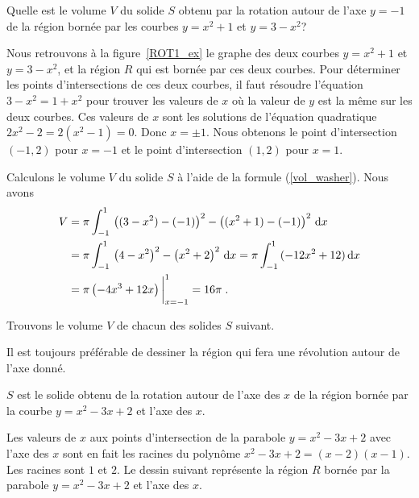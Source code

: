 {\begin{egg}
Quelle est le volume $V$ du solide $S$ obtenu par la rotation autour de l'axe
$y=-1$ de la région bornée par les courbes $y=x^2+1$ et $y=3-x^2$?

Nous retrouvons à la figure~\ref{ROT1_ex} le graphe des deux courbes
$y=x^2+1$ et $y=3-x^2$, et la région $R$ qui est bornée par ces deux
courbes.  Pour
déterminer les points d'intersections de ces deux courbes, il faut résoudre
l'équation $3-x^2 = 1+x^2$ pour trouver les valeurs de $x$ où la valeur de
$y$ est la même sur les deux courbes. Ces valeurs de $x$ sont les
solutions de l'équation quadratique $2x^2-2 = 2(x^2-1)=0$.  Donc
$x=\pm 1$.  Nous obtenons le point d'intersection $(-1,2)$ pour $x=-1$ et
le point d'intersection $(1,2)$ pour $x=1$.

Calculons le volume $V$ du solide $S$ à l'aide de la formule
(\ref{vol_washer}).  Nous avons
\begin{align*}
V &= \pi \int_{-1}^1 \, \left( (3-x^2) - (-1)\right)^2
 - \left( (x^2+1) - (-1)\right)^2 \,\mathrm{d}x \\
&= \pi \int_{-1}^1 \, \left( 4-x^2\right)^2-\left(x^2+2\right)^2 \,\mathrm{d}x
= \pi \int_{-1}^1 \, (-12 x^2 + 12) \,\mathrm{d}x \\
&= \pi \left( -4 x^3 + 12x \right)\bigg|_{x=-1}^1
= 16 \pi \; .
\end{align*}
\label{ROT_ex1}
\end{egg}


\begin{egg}
Trouvons le volume $V$ de chacun des solides $S$ suivant.

Il est toujours préférable de dessiner la région qui fera une révolution
autour de l'axe donné.

 $S$ est le solide obtenu de la rotation autour de l'axe des $x$ de
la région bornée par la courbe $y=x^2-3x+2$ et l'axe des $x$.

Les valeurs de $x$ aux points d'intersection de la parabole
$y=x^2-3x+2$ avec l'axe des $x$ sont en fait les racines du
polynôme $x^2-3x+2=(x-2)(x-1)$.  Les racines sont $1$ et $2$.
Le dessin suivant représente la région $R$ bornée par
la parabole $y=x^2-3x+2$ et l'axe des $x$.


\end{egg}}
